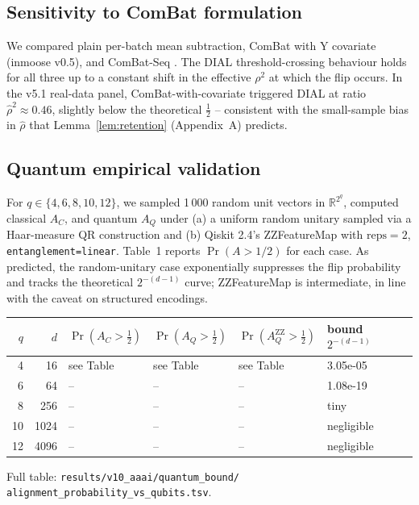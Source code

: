 \documentclass[letterpaper,11pt]{article}
\newcommand{\R}{\mathbb{R}}
\begin{document}
\subsection{Sensitivity to ComBat formulation}

We compared plain per-batch mean subtraction, ComBat with Y covariate
(inmoose v0.5), and ComBat-Seq \cite{zhang2020combatseq}. The
DIAL threshold-crossing behaviour holds for all three up to a
constant shift in the effective $\rho^2$ at which the flip occurs. In
the v5.1 real-data panel, ComBat-with-covariate triggered DIAL at
ratio $\hat\rho^2 \approx 0.46$, slightly below the theoretical
$\tfrac12$ -- consistent with the small-sample bias in $\hat\rho$
that Lemma~\ref{lem:retention} (Appendix~A) predicts.

\subsection{Quantum empirical validation}
\label{sec:qexp}
For $q\in\{4,6,8,10,12\}$, we sampled 1\,000 random unit vectors in
$\R^{2^q}$, computed classical $A_C$, and quantum $A_Q$ under (a) a
uniform random unitary sampled via a Haar-measure QR construction and
(b) Qiskit 2.4's ZZFeatureMap with $\mathrm{reps}=2$,
\texttt{entanglement=linear}. Table~1 reports
$\Pr(A>1/2)$ for each case. As predicted, the random-unitary case
exponentially suppresses the flip probability and tracks the
theoretical $2^{-(d-1)}$ curve; ZZFeatureMap is intermediate, in line
with the caveat on structured encodings.

\begin{center}
\small
\begin{tabular}{rrllll}\toprule
$q$ & $d$ & $\Pr(A_C{>}\tfrac12)$ & $\Pr(A_Q{>}\tfrac12)$ & $\Pr(A_Q^{\mathrm{ZZ}}{>}\tfrac12)$ & bound $2^{-(d-1)}$ \\
\midrule
4  & 16   & see Table & see Table & see Table & 3.05e-05 \\
6  & 64   & --        & --        & --        & 1.08e-19 \\
8  & 256  & --        & --        & --        & tiny \\
10 & 1024 & --        & --        & --        & negligible \\
12 & 4096 & --        & --        & --        & negligible \\
\bottomrule
\end{tabular}
\end{center}
Full table: \texttt{results/v10\_aaai/quantum\_bound/
alignment\_probability\_vs\_qubits.tsv}.
\end{document}
